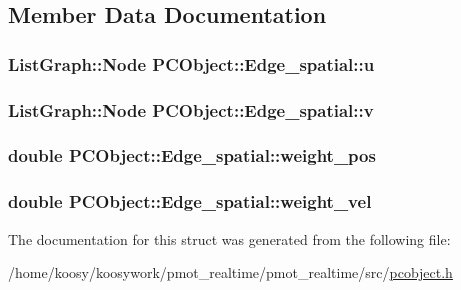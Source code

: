 \subsection{\-Member \-Data \-Documentation}
\hypertarget{struct_p_c_object_1_1_edge__spatial_a2d9774f6ad421e7852dee873d267b420}{
\subsubsection[{u}]{\setlength{\rightskip}{0pt plus 5cm}\-List\-Graph\-::\-Node {\bf \-P\-C\-Object\-::\-Edge\-\_\-spatial\-::u}}}\label{struct_p_c_object_1_1_edge__spatial_a2d9774f6ad421e7852dee873d267b420}
\hypertarget{struct_p_c_object_1_1_edge__spatial_ac395ba6d91a7054ea23ad9d5711a44f5}{
\subsubsection[{v}]{\setlength{\rightskip}{0pt plus 5cm}\-List\-Graph\-::\-Node {\bf \-P\-C\-Object\-::\-Edge\-\_\-spatial\-::v}}}\label{struct_p_c_object_1_1_edge__spatial_ac395ba6d91a7054ea23ad9d5711a44f5}
\hypertarget{struct_p_c_object_1_1_edge__spatial_a1bb24b8152a4c3310f933c041fec1a48}{
\subsubsection[{weight\-\_\-pos}]{\setlength{\rightskip}{0pt plus 5cm}double {\bf \-P\-C\-Object\-::\-Edge\-\_\-spatial\-::weight\-\_\-pos}}}\label{struct_p_c_object_1_1_edge__spatial_a1bb24b8152a4c3310f933c041fec1a48}
\hypertarget{struct_p_c_object_1_1_edge__spatial_a9c3350fad42237e5eb7cc13f0509a0ce}{
\subsubsection[{weight\-\_\-vel}]{\setlength{\rightskip}{0pt plus 5cm}double {\bf \-P\-C\-Object\-::\-Edge\-\_\-spatial\-::weight\-\_\-vel}}}\label{struct_p_c_object_1_1_edge__spatial_a9c3350fad42237e5eb7cc13f0509a0ce}


\-The documentation for this struct was generated from the following file\-:\begin{DoxyCompactItemize}
\item 
/home/koosy/koosywork/pmot\-\_\-realtime/pmot\-\_\-realtime/src/\hyperlink{pcobject_8h}{pcobject.\-h}\end{DoxyCompactItemize}
